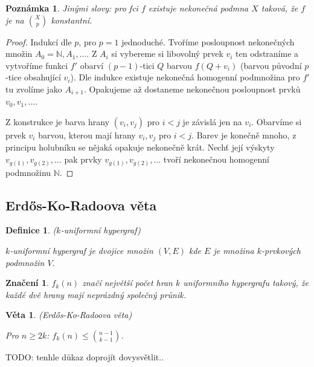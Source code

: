 \documentclass[a4paper,10pt,titlepage]{article} \usepackage[utf8]{inputenc}
\newtheorem{theorem}{Věta}
\newtheorem{define}{Definice}
\newtheorem*{notation}{Značení}
\newtheorem*{remark}{Poznámka}
\begin{document}
\begin{remark}
Jinými slovy: pro fci $f$ existuje nekonečná podmna $X$ taková, že $f$ je na $\binom{X}{p}$ konstantní.
\end{remark}

\begin{proof}
Indukcí dle $p$, pro $p=1$ jednoduché.
Tvoříme posloupnost nekonečných množin $A_0 = \mathbb{N},A_1, \ldots $.
Z $A_i$ si vybereme si libovolný prvek $v_i$ ten odstraníme a vytvoříme funkci $f'$ obarví $(p-1)$-tici $Q$ barvou $f(Q+v_i)$
(barvou původní $p$-tice obsahující $v_i$).
Dle indukce existuje nekonečná homogenní podmnožina pro $f'$ tu zvolíme jako $A_{i+1}$.
Opakujeme až dostaneme nekonečnou posloupnost prvků $v_0,v_1, \ldots $.
 
Z konstrukce je barva hrany $(v_i, v_j)$ pro $i<j$ je závislá jen na $v_i$.
Obarvíme si prvek $v_i$ barvou, kterou mají hrany $v_i,v_j$ pro $i<j$.
Barev je konečně mnoho, z principu holubníku se nějaká opakuje nekonečně krát.
Nechť její výskyty $v_{g(1)},v_{g(2)}, \ldots$ pak prvky $v_{g(1)},v_{g(2)}, \ldots$
tvoří nekonečnou homogenní podmnožinu $\mathbb{N}$.
\end{proof}

\subsection{Erd\H{o}s-Ko-Radoova věta}

\begin{define}
($k$-uniformní hypergraf)

$k$-uniformní hypergraf je dvojice množin $(V,E)$ kde $E$ je množina $k$-prvkových podmnožin $V$.
\end{define}

\begin{notation}
$f_k(n)$ značí největší počet hran $k$ uniformního hypergrafu takový, že každé dvě hrany mají neprázdný společný průnik.
\end{notation}

\begin{theorem}
(Erd\H{o}s-Ko-Radoova věta)

Pro $n\geq 2k$: $f_k(n) \leq \binom{n-1}{k-1}$.
\end{theorem}

TODO: tenhle důkaz doprojít dovysvětlit..
\end{document}
